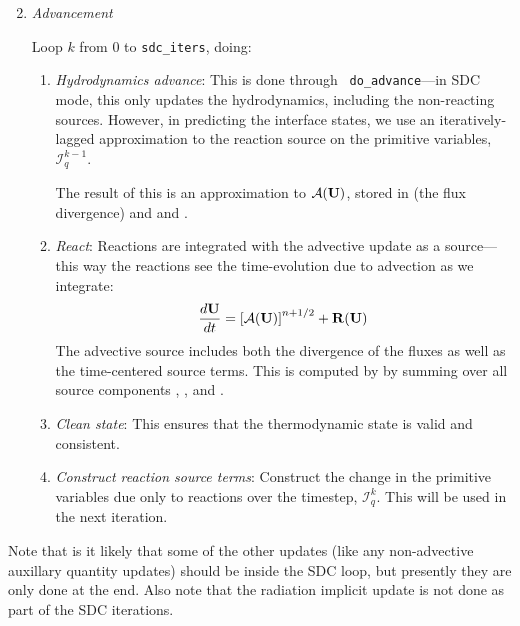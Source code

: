 \begin{enumerate}
\setcounter{enumi}{1}

\item {\em Advancement}

  Loop $k$ from 0 to {\tt sdc\_iters}, doing:

  \begin{enumerate}
    \item {\em Hydrodynamics advance}: This is done through {\tt
      do\_advance}---in SDC mode, this only updates the hydrodynamics,
      including the non-reacting sources.  However, in predicting the
      interface states, we use an iteratively-lagged approximation to the 
      reaction source on the primitive variables, $\mathcal{I}_q^{k-1}$.  

      The result of this is an approximation to $\mathcal{A}({\bf U})$,
      stored in  (the flux divergence)
      and  and .

    \item {\em React}: Reactions are integrated with the advective
      update as a source---this way the reactions see the
      time-evolution due to advection as we integrate:
      \begin{equation}
        \frac{d{\bf U}}{dt} = \left [ \mathcal{A}({\bf U}) \right ]^{n+1/2} + {\bf R}({\bf U})
      \end{equation}
     The advective source includes both the divergence of the fluxes
      as well as the time-centered source terms.  This is computed by
       by summing over all source components
      , , and
      .  

    \item {\em Clean state}: This ensures that the thermodynamic state is
      valid and consistent.

    \item {\em Construct reaction source terms}: Construct the change
      in the primitive variables due only to reactions over the
      timestep, $\mathcal{I}_q^{k}$.  This will be used in the next
      iteration.
  \end{enumerate}


\end{enumerate}


Note that is it likely that some of the other updates (like any
non-advective auxillary quantity updates) should be inside the SDC
loop, but presently they are only done at the end.  Also note that the
radiation implicit update is not done as part of the SDC iterations.



